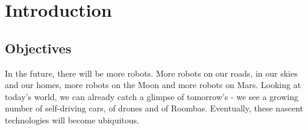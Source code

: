 \chapter{Introduction}
\section{Objectives}





In the future, there will be more robots. More robots on our roads, in our skies and our homes, more robots on the Moon and more robots on Mars. Looking at today's world, we can already catch a glimpse of tomorrow's - we see a growing number of self-driving cars, of drones and of Roombas. Eventually, these nascent technologies will become ubiquitous. 


